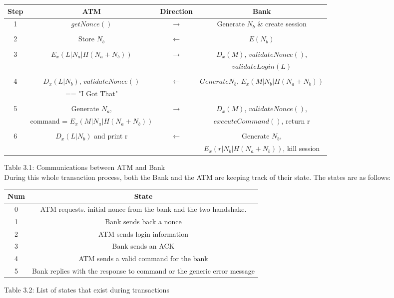 \documentclass[10pt,a4paper]{article}
\begin{document}
\begin{tabular}{|c|ccc|}
	\hline
Step &  ATM  & Direction & Bank \\
	\hline
1   & $getNonce()$ & $\rightarrow$ & Generate $N_b$ \& create session  \\\\
2   & Store $N_b$ & $\leftarrow$ & $E(N_b)$  \\\\
3   & $E_x(L|N_a|H(N_a + N_b))$ & $\rightarrow$ & $D_x(M)$, $validateNonce()$,\\
	& & & $validateLogin(L)$ \\\\
4   & $D_x(L|N_b)$, $validateNonce()$ & $\leftarrow$ & $Generate N_b$, $E_x(M|N_b|H(N_a+N_b))$ \\  & == "I Got That" & &\\\\
5   & Generate $N_a$, & $\rightarrow$ & $D_x(M)$, $validateNonce()$, \\
	& command = $E_x(M|N_a|H(N_a+N_b))$ & & $executeCommand()$, return r\\\\
6   & $D_x(L|N_b)$ and print r & $\leftarrow$ & Generate $N_b$, \\
	& & & $E_x(r|N_b|H(N_a+N_b))$, kill session\\
	\hline
\end{tabular}

{\footnotesize Table 3.1: Communications between ATM and Bank}\\

During this whole transaction process, both the Bank and the ATM are keeping track of their state. The states are as follows:\\

\begin{tabular}{|c|c|}
	\hline
Num & State\\
	\hline
0 & ATM requests. initial nonce from the bank and the two handshake.\\
1 & Bank sends back a nonce\\
2 & ATM sends login information\\
3 & Bank sends an ACK\\
4 & ATM sends a valid command for the bank\\
5 & Bank replies with the response to command or the generic error message\\
	\hline
\end{tabular}

{\footnotesize Table 3.2: List of states that exist during transactions}\\
\end{document}

